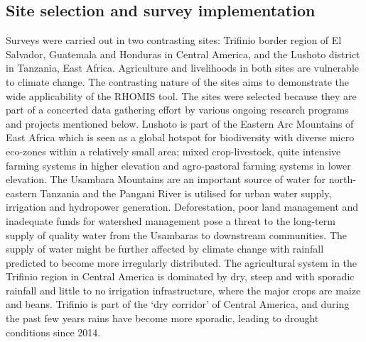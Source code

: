\subsection{Site selection and survey implementation}
Surveys were carried out in two contrasting sites: Triﬁnio border region of El Salvador, Guatemala and Honduras in Central America, and the Lushoto district in Tanzania, East Africa. Agriculture and livelihoods in both sites are vulnerable to climate change. The contrasting nature of the sites aims to demonstrate the wide applicability of the RHOMIS tool. The sites were selected because they are part of a concerted data gathering effort by various ongoing research programs and projects mentioned below. Lushoto is part of the Eastern Arc Mountains of East Africa which is seen as a global hotspot for biodiversity with diverse micro eco-zones within a relatively small area; mixed crop-livestock, quite intensive farming systems in higher elevation and agro-pastoral farming systems in lower elevation. The Usambara Mountains are an important source of water for north-eastern Tanzania and the Pangani River is utilised for urban water supply, irrigation and hydropower generation. Deforestation, poor land management and inadequate funds for watershed management pose a threat to the long-term supply of quality water from the Usambaras to downstream communities. The supply of water might be further affected by climate change with rainfall predicted to become more irregularly distributed. The agricultural system in the Triﬁnio region in Central America is dominated by dry, steep and with sporadic rainfall and little to no irrigation infrastructure, where the major crops are maize and beans. Triﬁnio is part of the `dry corridor' of Central America, and during the past few years rains have become more sporadic, leading to drought conditions since 2014.

